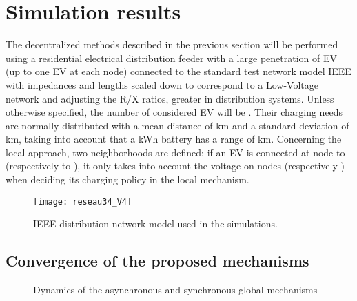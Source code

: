 \documentclass[journal]{IEEEtran}
\begin{document}
\section{Simulation results}


The decentralized methods described in the previous section will be performed using a residential electrical distribution feeder with a large penetration of EV (up to one EV at each node) connected to the standard test network model IEEE  with impedances and lengths scaled down to correspond to a Low-Voltage network and adjusting the R/X ratios, greater in distribution systems. Unless otherwise specified, the number of considered EV will be . Their charging needs are normally distributed with a mean distance of km and a standard deviation of km, taking into account that a kWh battery has a range of km. Concerning the local approach, two neighborhoods are defined: if an EV is connected at node  to  (respectively  to ), it only takes into account the voltage on nodes  (respectively ) when deciding its charging policy in the local mechanism. 

\begin{figure}[!htbp]
\centering
\texttt{[image: reseau34\_V4]}
\caption{IEEE  distribution network model used in the simulations.}
\label{DistribNet}
\end{figure}

\subsection{Convergence of the proposed mechanisms}


\begin{figure}[tbp]\vspace{-3mm}
\begin{center}\vspace{-2mm}
\vspace{-2mm}
\caption{Dynamics of the asynchronous and synchronous global mechanisms}
\label{fig:Dyn} 
\end{center}\vspace{-5mm}
\end{figure}
\end{document}
